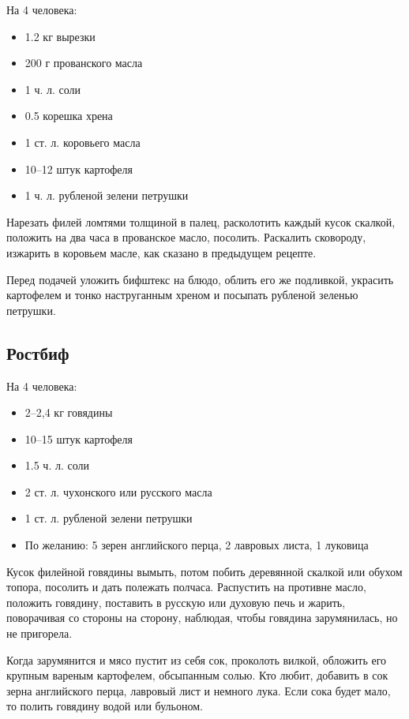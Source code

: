 На 4 человека: 

\begin{itemize}
	\item 1.2 кг вырезки 
    \item 200 г прованского масла 
    \item 1 ч. л. соли 
    \item 0.5 корешка хрена 
    \item 1 ст. л. коровьего масла 
    \item 10–12 штук картофеля 
    \item 1 ч. л. рубленой зелени петрушки
\end{itemize}

Нарезать филей ломтями толщиной в палец, расколотить каждый кусок скалкой, положить на два часа в прованское масло, посолить. Раскалить сковороду, изжарить в коровьем масле, как сказано в предыдущем рецепте.

Перед подачей уложить бифштекс на блюдо, облить его же подливкой, украсить картофелем и тонко наструганным хреном и посыпать рубленой зеленью петрушки.

\subsection{Ростбиф}\label{5rostbif}

На 4 человека: 

\begin{itemize}
	\item 2–2,4 кг говядины 
    \item 10–15 штук картофеля 
    \item 1.5 ч. л. соли 
    \item 2 ст. л. чухонского или русского масла 
    \item 1 ст. л. рубленой зелени петрушки 
    \item По желанию: 5 зерен английского перца, 2 лавровых листа, 1 луковица
\end{itemize}

Кусок филейной говядины вымыть, потом побить деревянной скалкой или обухом топора, посолить и дать полежать полчаса. Распустить на противне масло, положить говядину, поставить в русскую или духовую печь и жарить, поворачивая со стороны на сторону, наблюдая, чтобы говядина зарумянилась, но не пригорела.

Когда зарумянится и мясо пустит из себя сок, проколоть вилкой, обложить его крупным вареным картофелем, обсыпанным солью. Кто любит, добавить в сок зерна английского перца, лавровый лист и немного лука. Если сока будет мало, то полить говядину водой или бульоном.

